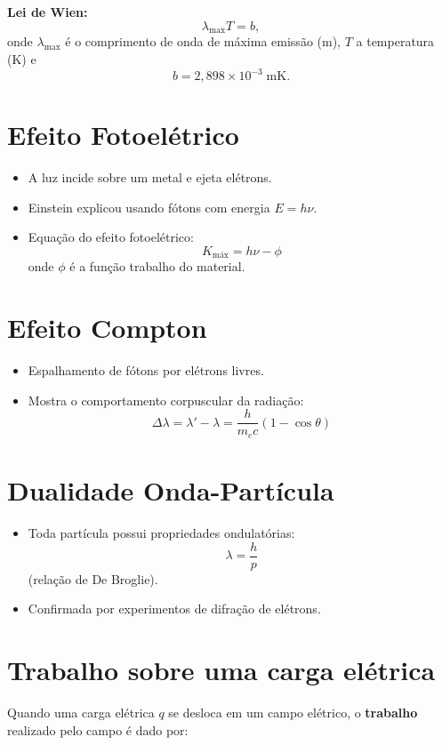 \documentclass[a4paper,12pt]{article}
\begin{document}
\begin{multicols}{2}
\vspace{0.5cm}

\textbf{Lei de Wien:}
\[
\lambda_{\max} T = b,
\]
onde \(\lambda_{\max}\) é o comprimento de onda de máxima emissão (m), \( T \) a temperatura (K) e
\[
b = 2{,}898 \times 10^{-3} \; \si{\meter \kelvin}.
\]

\section{Efeito Fotoelétrico}
\begin{itemize}
    \item A luz incide sobre um metal e ejeta elétrons.
    \item Einstein explicou usando fótons com energia $E = h\nu$.
    \item Equação do efeito fotoelétrico:
    \[
        K_{\text{máx}} = h\nu - \phi
    \]
    onde $\phi$ é a função trabalho do material.
\end{itemize}

\section{Efeito Compton}
\begin{itemize}
    \item Espalhamento de fótons por elétrons livres.
    \item Mostra o comportamento corpuscular da radiação:
    \[
        \Delta \lambda = \lambda' - \lambda = \frac{h}{m_e c} (1 - \cos \theta)
    \]
\end{itemize}

\section{Dualidade Onda-Partícula}
\begin{itemize}
    \item Toda partícula possui propriedades ondulatórias:
    \[
        \lambda = \frac{h}{p}
    \]
    (relação de De Broglie).
    \item Confirmada por experimentos de difração de elétrons.
\end{itemize}

\section{Trabalho sobre uma carga elétrica}

Quando uma carga elétrica \( q \) se desloca em um campo elétrico, o \textbf{trabalho} realizado pelo campo é dado por:


\end{multicols}
\end{document}
